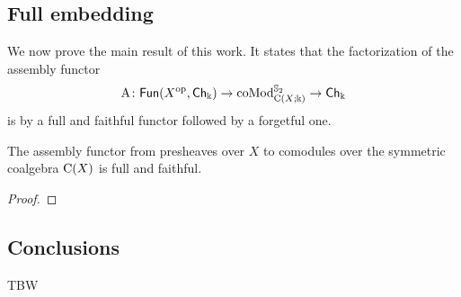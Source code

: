 \subsection{Full embedding} \label{ss:full embedding}

We now prove the main result of this work.
It states that the factorization of the assembly functor
\[
\operatorname{A} \colon \mathsf{Fun}(X^{\mathrm{op}}, \mathsf{Ch}_\Bbbk) \to \operatorname{coMod}^{\mathbb{S}_2}_{\operatorname{C}(X;\Bbbk)} \to \mathsf{Ch}_{\Bbbk}
\]
is by a full and faithful functor followed by a forgetful one.

\begin{theorem*}
	The assembly functor from presheaves over $X$ to comodules over the symmetric coalgebra $\operatorname{C}(X)$ is full and faithful.
\end{theorem*}

\begin{proof}
	
\end{proof}

\subsection{Conclusions}

TBW